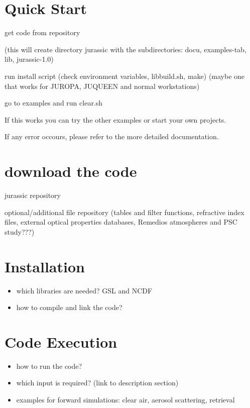 \section{Quick Start}

get code from repository

(this will create directory jurassic with the subdirectories: docu, examples-tab, lib, jurassic-1.0)

run install script (check environment variables, lib\/build.sh, make) (maybe one that works for JUROPA, JUQUEEN and normal workstations)

go to examples and run clear.sh

If this works you can try the other examples or start your own projects. 

If any error occours, please refer to the more detailed documentation.

\section{download the code}
jurassic repository

optional/additional file repository (tables and filter functions, refractive index files, external optical properties databases, Remedios atmospheres and PSC study???)

\section{Installation}
\begin{itemize}
\item which libraries are needed? GSL and NCDF
\item how to compile and link the code?
\end{itemize}

\section{Code Execution}
\begin{itemize}
\item how to run the code?
\item which input is required? (link to description section)
\item examples for forward simulations: clear air, aerosol scattering, retrieval
\end{itemize}

